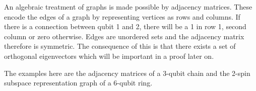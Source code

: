 
\begin{center}
\end{center}

\noindent An algebraic treatment of graphs is made possible by adjacency matrices. These encode the edges of a graph by representing vertices as rows and columns. If there is a connection between qubit 1 and 2, there will be a 1 in row 1, second column or zero  otherwise. Edges are unordered sets and the adjacency matrix therefore is symmetric. The consequence of this is that there exists a set of orthogonal eigenvectors which will be important in a proof later on.\par
The examples here are the adjacency matrices of a 3-qubit chain and the 2-spin subspace representation graph of a 6-qubit ring.


